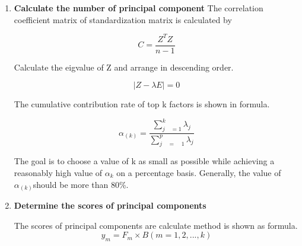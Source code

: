 \documentclass{mcmthesis}
\begin{document}
\begin{enumerate}
          \item \textbf{Calculate the number of principal component}
          The correlation coefficient matrix of standardization matrix is calculated by
          \begin{table}[!hbpt]
               \centering
               $$ C=\frac { { Z }^{ T }Z }{ n-1 }  $$
          \end{table}
          Calculate the eigvalue of Z and arrange in descending order.
          \begin{table}[!hbpt]
               \centering
               $$ |Z - \lambda E| = 0  $$
          \end{table}
          The cumulative contribution rate of top k factors is shown in formula.
          \begin{table}[!hbpt]
               \centering
               $$ { \alpha  }_{ (k) }=\frac { \sum _{ j\quad = 1 }^{ k }{ { \lambda  }_{ j } }  }{ \sum _{ j\quad =\quad 1 }^{ p }{ { \lambda  }_{ j } }  }   $$
          \end{table}
          The goal is to choose a value of k as small as possible while achieving a reasonably high value of ${\alpha}_{k}$ on a percentage basis. Generally, the value of $\alpha_{(k)}$should be more than 80\%.

          \item \textbf{Determine the scores of  principal components}

          The scores of principal components are calculate method is shown as formula.
               $$ y_m = F_m \times B (m=1,2,...,k)  $$
          \end{enumerate}
\end{document}
